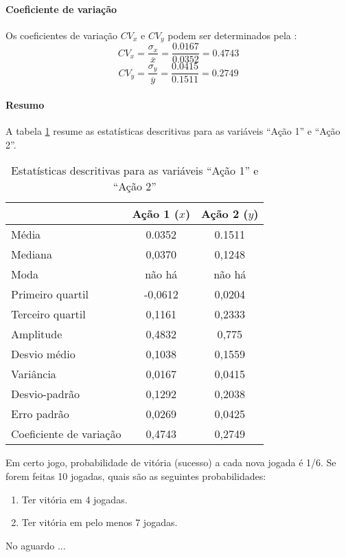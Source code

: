 \begin{resolucao}
\paragraph{Coeficiente de variação} Os coeficientes de variação $CV_x$ e
$CV_y$ podem ser determinados pela :
 \[
     CV_x = \frac{\sigma_x}{\overline{x}}
     = \frac{0.0167}{0.0352} = 0.4743
\]
 \[
     CV_y = \frac{\sigma_y}{\overline{y}}
     = \frac{0.0415}{0.1511} = 0.2749
\]

\paragraph{Resumo} A tabela \ref{tab:resumo-m02ex02} resume as estatísticas
descritivas para as variáveis ``Ação 1'' e ``Ação 2''.
\begin{table}[htpb]
    \centering
    \begin{tabular}{lcc}
    \toprule
                            & Ação 1 ($x$) & Ação 2 ($y$) \\
    \midrule
    Média                   & 0.0352       & 0.1511 \\
    Mediana                 & 0,0370       & 0,1248 \\
    Moda                    & não há       & não há \\
    Primeiro quartil        & -0,0612      & 0,0204 \\
    Terceiro quartil        & 0,1161       & 0,2333 \\
    Amplitude               & 0,4832       & 0,775 \\
    Desvio médio            & 0,1038       & 0,1559 \\
    Variância               & 0,0167       & 0,0415 \\
    Desvio-padrão           & 0,1292       & 0,2038 \\
    Erro padrão             & 0,0269       & 0,0425 \\
    Coeficiente de variação & 0,4743       & 0,2749 \\
    \bottomrule
    \end{tabular}
    \caption{Estatísticas descritivas para as variáveis ``Ação 1'' e ``Ação 2''}
    \label{tab:resumo-m02ex02}
\end{table}
\end{resolucao}

\begin{exercise}
Em certo jogo, probabilidade de vitória (sucesso) a cada nova jogada é 1/6.
Se forem feitas 10 jogadas, quais são as seguintes probabilidades:
\begin{enumerate}[label=\alph*)]
    \item Ter vitória em 4 jogadas.
    \item Ter vitória em pelo menos 7 jogadas.
\end{enumerate}
\end{exercise}

\begin{resolucao}
No aguardo ...
\end{resolucao}
